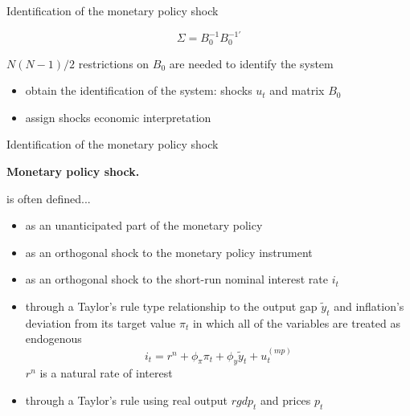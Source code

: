 \documentclass[notes,blackandwhite,mathsans,usenames,dvipsnames]{beamer}
\begin{document}
 

\begin{frame}{Identification of the monetary policy shock}

$$\Sigma = B_0^{-1}B_0^{-1\prime}$$

 $N(N-1)/2$ {\color{mcxs2}restrictions on} $B_0$ {\color{mcxs2}are needed to identify the system}

\begin{itemize}[label=\textbullet,leftmargin = *]
\item {\color{mcxs2}obtain the identification of the system: shocks} $u_t$ {\color{mcxs2}and matrix} $B_0$
\item {\color{mcxs2}assign shocks economic interpretation}
\end{itemize}
\end{frame}



\begin{frame}{Identification of the monetary policy shock}

\textbf{Monetary policy shock.}

{\color{mcxs2}is often defined...} 
\begin{itemize}[label=\textbullet,leftmargin = *]
\item {\color{mcxs2}as an unanticipated part of the monetary policy}
\item {\color{mcxs2}as an orthogonal shock to the monetary policy instrument}
\item {\color{mcxs2}as an orthogonal shock to the} {\color{purple}short-run nominal interest rate} $i_t$
\item {\color{mcxs2}through a Taylor's rule type relationship to the output gap} $\tilde{y}_t$ {\color{mcxs2}and inflation's deviation from its target value} $\pi_t$ {\color{mcxs2}in which all of the variables are treated as endogenous}
$$ i_t = r^n + \phi_\pi \pi_t + \phi_y \tilde{y}_t + u_t^{(mp)} $$
$r^n$ {\color{mcxs2}is a natural rate of interest}
\item {\color{mcxs2}through a Taylor's rule using real output} $rgdp_t$ {\color{mcxs2}and prices} $p_t$
\end{itemize}
\end{frame}
\end{document}
